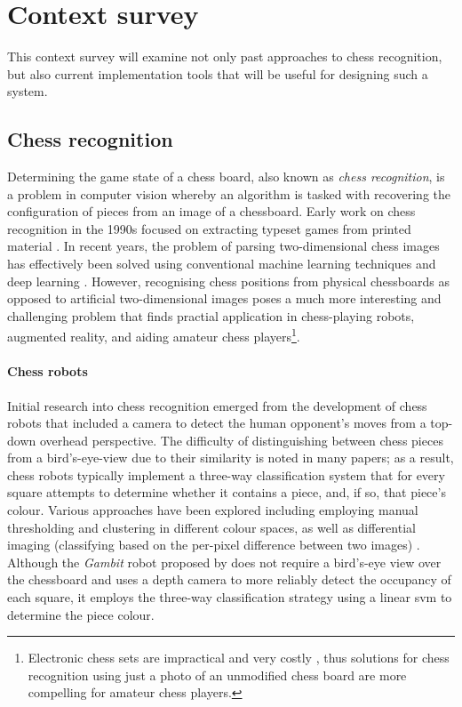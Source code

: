 \section{Context survey}
This context survey will examine not only past approaches to chess recognition, but also current implementation tools that will be useful for designing such a system.

\subsection{Chess recognition}
Determining the game state of a chess board, also known as \emph{chess recognition}, is a problem in computer vision whereby an algorithm is tasked with recovering the configuration of pieces from an image of a chessboard.
Early work on chess recognition in the 1990s focused on extracting typeset games from printed material \cite{baird1990}. 
In recent years, the problem of parsing two-dimensional chess images has effectively been solved using conventional machine learning techniques \cite{khater2012} and deep learning \cite{sameer2020,roy2020}.
However, recognising chess positions from physical chessboards as opposed to artificial two-dimensional images poses a much more interesting and challenging problem that finds practial application in chess-playing robots, augmented reality, and aiding amateur chess players\footnote{Electronic chess sets are impractical and very costly \cite{wang2013}, thus solutions for chess recognition using just a photo of an unmodified chess board are more compelling for amateur chess players.}.

\paragraph{Chess robots}
Initial research into chess recognition emerged from the development of chess robots that included a camera to detect the human opponent's moves from a top-down overhead perspective. 
The difficulty of distinguishing between chess pieces from a bird's-eye-view due to their similarity is noted in many papers; as a result, chess robots typically implement a three-way classification system that for every square attempts to determine whether it contains a piece, and, if so, that piece's colour.
Various approaches have been explored including
  employing manual thresholding \cite{cour2002,urting2003,banerjee2012,chen2016} and clustering \cite{goncalves2005} in different colour spaces, as well as
  differential imaging (classifying based on the per-pixel difference between two images) \cite{khan2014,chen2019}.
Although the \emph{Gambit} robot proposed by \textcite{matuszek2011} does not require a bird's-eye view over the chessboard and uses a depth camera to more reliably detect the occupancy of each square, it employs the three-way classification strategy using a linear \gls{svm} to determine the piece colour. 

